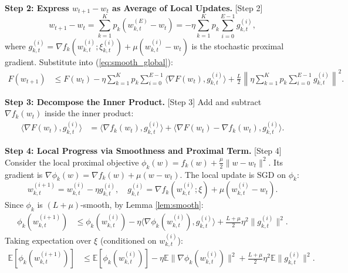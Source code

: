 \documentclass{article}
\begin{document}
\textbf{Step 2: Express $w_{t+1} - w_t$ as Average of Local Updates.} [Step 2]
\begin{equation}
    w_{t+1} - w_t = \sum_{k=1}^K p_k (w_{k,t}^{(E)} - w_t) = -\eta \sum_{k=1}^K p_k \sum_{i=0}^{E-1} g_{k,t}^{(i)},
\end{equation}
where $g_{k,t}^{(i)} = \nabla f_k(w_{k,t}^{(i)}; \xi_{k,t}^{(i)}) + \mu (w_{k,t}^{(i)} - w_t)$ is the stochastic proximal gradient.
Substitute into (\ref{eq:smooth_global}):
\begin{align}
    F(w_{t+1}) &\leq F(w_t) - \eta \sum_{k=1}^K p_k \sum_{i=0}^{E-1} \langle \nabla F(w_t), g_{k,t}^{(i)} \rangle + \frac{L}{2} \left\| \eta \sum_{k=1}^K p_k \sum_{i=0}^{E-1} g_{k,t}^{(i)} \right\|^2. \label{eq:global_progress}
\end{align}

\textbf{Step 3: Decompose the Inner Product.} [Step 3]
Add and subtract $\nabla f_k(w_t)$ inside the inner product:
\begin{align}
    \langle \nabla F(w_t), g_{k,t}^{(i)} \rangle &= \langle \nabla f_k(w_t), g_{k,t}^{(i)} \rangle + \langle \nabla F(w_t) - \nabla f_k(w_t), g_{k,t}^{(i)} \rangle. \label{eq:inner_decomp}
\end{align}

\textbf{Step 4: Local Progress via Smoothness and Proximal Term.} [Step 4]
Consider the local proximal objective $\phi_k(w) = f_k(w) + \frac{\mu}{2} \| w - w_t \|^2$. Its gradient is $\nabla \phi_k(w) = \nabla f_k(w) + \mu (w - w_t)$. The local update is SGD on $\phi_k$:
\begin{equation}
    w_{k,t}^{(i+1)} = w_{k,t}^{(i)} - \eta g_{k,t}^{(i)}, \quad g_{k,t}^{(i)} = \nabla f_k(w_{k,t}^{(i)}; \xi) + \mu (w_{k,t}^{(i)} - w_t).
\end{equation}
Since $\phi_k$ is $(L+\mu)$-smooth, by Lemma \ref{lem:smooth}:
\begin{align}
    \phi_k(w_{k,t}^{(i+1)}) &\leq \phi_k(w_{k,t}^{(i)}) - \eta \langle \nabla \phi_k(w_{k,t}^{(i)}), g_{k,t}^{(i)} \rangle + \frac{L+\mu}{2} \eta^2 \| g_{k,t}^{(i)} \|^2. \label{eq:local_smooth}
\end{align}
Taking expectation over $\xi$ (conditioned on $w_{k,t}^{(i)}$):
\begin{align}
    \mathbb{E}[\phi_k(w_{k,t}^{(i+1)})] &\leq \mathbb{E}[\phi_k(w_{k,t}^{(i)})] - \eta \mathbb{E} \| \nabla \phi_k(w_{k,t}^{(i)}) \|^2 + \frac{L+\mu}{2} \eta^2 \mathbb{E} \| g_{k,t}^{(i)} \|^2. \label{eq:local_exp}
\end{align}
\end{document}
